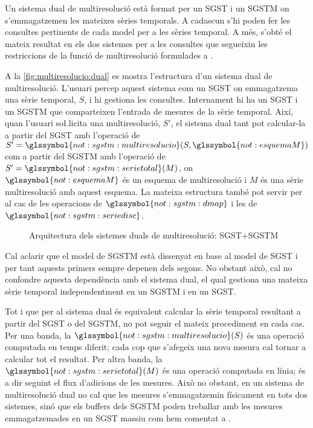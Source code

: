 Un sistema dual de multiresolució està format per un \gls{SGST} i un
\gls{SGSTM} on s'emmagatzemen les mateixes sèries temporals. A
cadascun s'hi poden fer les consultes pertinents de cada model per a les
sèries temporal. A més, s'obté el mateix resultat en els dos sistemes
per a les consultes que segueixin les restriccions de la funció de
multiresolució formulades a .


A la \autoref{fig:multiresolucio:dual} es mostra l'estructura d'un
sistema dual de multiresolució. L'usuari percep aquest sistema com un
\gls{SGST} on emmagatzema una sèrie temporal, $S$, i hi gestiona les
consultes. %
Internament hi ha un \gls{SGST} i un \gls{SGSTM} que comparteixen
l'entrada de mesures de la sèrie temporal. Així, quan l'usuari
so\l.licita una multiresolució, $S'$, el sistema dual tant pot
calcular-la a partir del \gls{SGST} amb l'operació de
$S'=\glssymbol{not:sgstm:multiresolucio}(S,\glssymbol{not:esquemaM})$
com a partir del \gls{SGSTM} amb l'operació de
$S'=\glssymbol{not:sgstm:serietotal}(M)$, on
$\glssymbol{not:esquemaM}$ és un esquema de multiresolució i $M$ és
una sèrie multiresolució amb aquest esquema.  La mateixa estructura
també pot servir per al cas de les operacions de
$\glssymbol{not:sgstm:dmap}$ i les de
$\glssymbol{not:sgstm:seriedisc}$.


\begin{figure}
  \centering
  
  \caption{Arquitectura dels sistemes duals de multiresolució:
    \gls{SGST}+\gls{SGSTM}}
  \label{fig:multiresolucio:dual}
\end{figure}


Cal aclarir que el model de \gls{SGSTM} està dissenyat en base al
model de \gls{SGST} i per tant aquests primers sempre depenen dels
segons. No obstant això, cal no confondre aquesta dependència amb el
sistema dual, el qual gestiona una mateixa sèrie temporal independentment
en un \gls{SGSTM} i en un \gls{SGST}.




Tot i que per al sistema dual és equivalent calcular la sèrie temporal
resultant a partir del \gls{SGST} o del \gls{SGSTM}, no pot seguir el
mateix procediment en cada cas. Per una banda, la
$\glssymbol{not:sgstm:multiresolucio}(S)$ és una operació computada en
temps diferit; cada cop que s'afegeix una nova mesura cal tornar a
calcular tot el resultat. Per altra banda, la
$\glssymbol{not:sgstm:serietotal}(M)$ és una operació computada en
línia; és a dir seguint el flux d'adicions de les mesures.  Això no
obstant, en un sistema de multiresolució dual no cal que les mesures
s'emmagatzemin físicament en tots dos sistemes, sinó que els buffers
dels \gls{SGSTM} poden treballar amb les mesures emmagatzemades en un
\gls{SGST} massiu com hem comentat a
.


